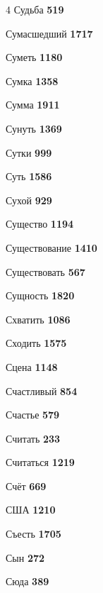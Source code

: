 \begin{multicols}{4}
\noindent Судьба \dotfill \textbf{\color{secondary} 519}\par
\noindent Сумасшедший \dotfill \textbf{\color{secondary} 1717}\par
\noindent Суметь \dotfill \textbf{\color{secondary} 1180}\par
\noindent Сумка \dotfill \textbf{\color{secondary} 1358}\par
\noindent Сумма \dotfill \textbf{\color{secondary} 1911}\par
\noindent Сунуть \dotfill \textbf{\color{secondary} 1369}\par
\noindent Сутки \dotfill \textbf{\color{secondary} 999}\par
\noindent Суть \dotfill \textbf{\color{secondary} 1586}\par
\noindent Сухой \dotfill \textbf{\color{secondary} 929}\par
\noindent Существо \dotfill \textbf{\color{secondary} 1194}\par
\noindent Существование \dotfill \textbf{\color{secondary} 1410}\par
\noindent Существовать \dotfill \textbf{\color{secondary} 567}\par
\noindent Сущность \dotfill \textbf{\color{secondary} 1820}\par
\noindent Схватить \dotfill \textbf{\color{secondary} 1086}\par
\noindent Сходить \dotfill \textbf{\color{secondary} 1575}\par
\noindent Сцена \dotfill \textbf{\color{secondary} 1148}\par
\noindent Счастливый \dotfill \textbf{\color{secondary} 854}\par
\noindent Счастье \dotfill \textbf{\color{secondary} 579}\par
\noindent Считать \dotfill \textbf{\color{secondary} 233}\par
\noindent Считаться \dotfill \textbf{\color{secondary} 1219}\par
\noindent Счёт \dotfill \textbf{\color{secondary} 669}\par
\noindent США \dotfill \textbf{\color{secondary} 1210}\par
\noindent Съесть \dotfill \textbf{\color{secondary} 1705}\par
\noindent Сын \dotfill \textbf{\color{secondary} 272}\par
\noindent Сюда \dotfill \textbf{\color{secondary} 389}\par


\end{multicols}

